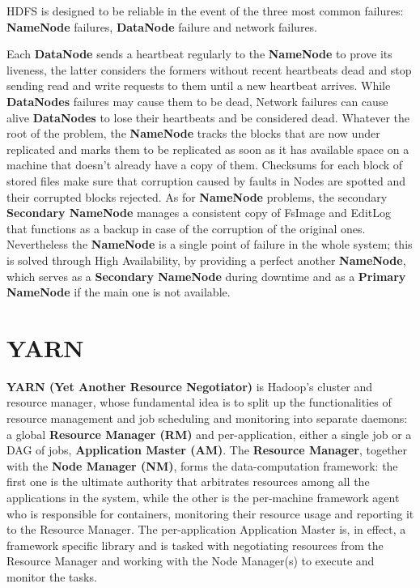 HDFS is designed to be reliable in the event of the three most common failures: \textbf{NameNode} failures, \textbf{DataNode} failure and network failures.

Each \textbf{DataNode} sends a heartbeat regularly to the \textbf{NameNode} to prove its liveness, the latter considers the formers without recent heartbeats dead and stop sending read and write requests to them until a new heartbeat arrives.\newline
While \textbf{DataNodes} failures may cause them to be dead, Network failures can cause alive \textbf{DataNodes} to lose their heartbeats and be considered dead.\newline
Whatever the root of the problem, the \textbf{NameNode} tracks the blocks that are now under replicated and marks them to be replicated as soon as it has available space on a machine that doesn't already have a copy of them.\newline
Checksums for each block of stored files make sure that corruption caused by faults in Nodes are spotted and their corrupted blocks rejected.\newline
As for \textbf{NameNode} problems, the secondary \textbf{Secondary NameNode} manages a consistent copy of FsImage and EditLog that functions as a backup in case of the corruption of the original ones. Nevertheless the \textbf{NameNode} is a single point of failure in the whole system; this is solved through High Availability, by providing a perfect another \textbf{NameNode}, which serves as a \textbf{Secondary NameNode} during downtime and as a \textbf{Primary NameNode} if the main one is not available.

\pagebreak
\section{YARN}

\textbf{YARN (Yet Another Resource Negotiator)} is Hadoop's cluster and resource manager, whose fundamental idea is to split up the functionalities of resource management and job scheduling and monitoring into separate daemons: a global \textbf{Resource Manager (RM)} and per-application, either a single job or a DAG of jobs, \textbf{Application Master (AM)}.
\newline\newline
The \textbf{Resource Manager}, together with the \textbf{Node Manager (NM)}, forms the data-computation framework: the first one is the ultimate authority that arbitrates resources among all the applications in the system, while the other is the per-machine framework agent who is responsible for containers, monitoring their resource usage and reporting it to the Resource Manager.
\newline\newline
The per-application Application Master is, in effect, a framework specific library and is tasked with negotiating resources from the Resource Manager and working with the Node Manager(s) to execute and monitor the tasks.


